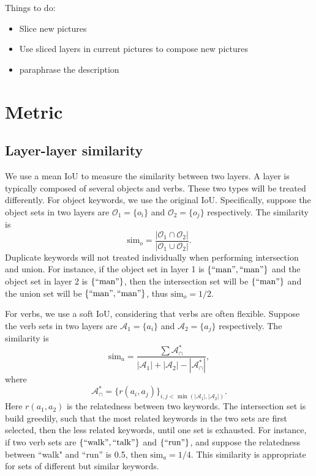 \documentclass{article} %
\begin{document}
Things to do:
\begin{itemize}
	\item Slice new pictures
	\item Use sliced layers in current pictures to compose new pictures
	\item paraphrase the description
\end{itemize}

\section{Metric}
\subsection{Layer-layer similarity}
We use a mean IoU to measure the similarity between two layers. A layer is typically composed of several objects and verbs. These two types will be treated differently. For object keywords, we use the original IoU. Specifically, suppose the object sets in two layers are $\mathcal{O}_1=\{o_i\}$ and $\mathcal{O}_2=\{o_j\}$ respectively. The similarity is
$$
\mathrm{sim}_o = \frac{|\mathcal{O}_1\cap\mathcal{O}_2|}{|\mathcal{O}_1\cup \mathcal{O}_2|}.
$$
Duplicate keywords will not treated individually when performing intersection and union. For instance, if the object set in layer 1 is $\{\mathrm{``man"},\mathrm{``man"}\}$ and the object set in layer 2 is $\{\mathrm{``man"}\}$, then the intersection set will be $\{\mathrm{``man"}\}$ and the union set will be $\{\mathrm{``man"},\mathrm{``man"}\}$, thus $\mathrm{sim}_o = 1/2$.

For verbs, we use a soft IoU, considering that verbs are often flexible. Suppose the verb sets in two layers are $\mathcal{A}_1=\{a_i\}$ and $\mathcal{A}_2=\{a_j\}$ respectively. The similarity is
$$
\mathrm{sim}_a = \frac{\sum\mathcal{A}^*_\cap}{|\mathcal{A}_1|+|\mathcal{A}_2| - |\mathcal{A}^*_\cap|},
$$
where
$$
\mathcal{A}^*_\cap = \{r(a_i, a_j)\}_{i,j<\min(|\mathcal{A}_1|,|\mathcal{A}_2|)}.
$$
Here $r(a_1,a_2)$ is the relatedness between two keywords. The intersection set is build greedily, such that the most related keywords in the two sets are first selected, then the less related keywords, until one set is exhausted. For instance, if two verb sets are $\{\mathrm{``walk"},\mathrm{``talk"}\}$ and $\{\mathrm{``run"}\}$, and suppose the relatedness between ``walk" and ``run'' is 0.5, then $\mathrm{sim}_a = 1/4$. This similarity is appropriate for sets of different but similar keywords.
\end{document}
